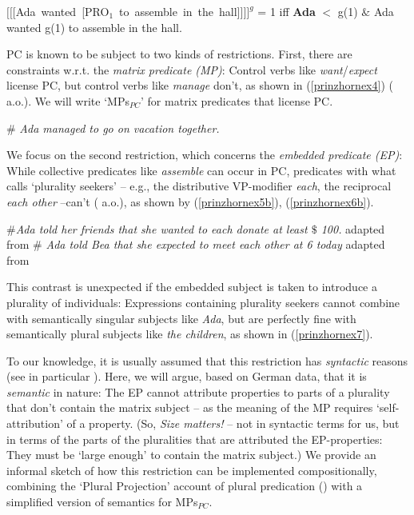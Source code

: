 \documentclass[output=paper,colorlinks,citecolor=brown,
]{langscibook}
\newcommand{\sem}[2]{\mbox{$[\![${#2}$]\!]^{#1}$}} %
\begin{document}
\ea	\label{prinzhornex3} \sem{g}{[Ada wanted [PRO$_{1}$ to assemble in the hall]]} = 1 iff \textbf{Ada} $<$ g(1) $\&$ Ada wanted g(1) to assemble in the hall. \z

PC is known to be subject to two kinds of restrictions. First, there are constraints w.r.t. the {\it matrix predicate (MP)}: Control verbs like {\it want}/{\it expect} license PC, but control verbs like {\it  manage} don't, as shown in (\ref{prinzhornex4}) (\citealt{Landau:2000, Pearson:2016} a.o.). We will write `MPs$_{PC}$' for matrix predicates that license PC.

\ea 	\label{prinzhornex4}
  $\#$ {\it Ada managed  to go on vacation together.} \hfill \cite[(2b)]{Pearson:2016}
\z
	
We focus on the second restriction, which concerns the {\it embedded predicate (EP)}: While collective predicates like  {\it assemble} can occur in PC, predicates with what \cite{Schwarzschild:1996} calls `plurality seekers' -- e.g., the distributive VP-modifier {\it each}, the reciprocal  {\it each other} --can't (\citealt{Landau:2000} a.o.), as shown by (\ref{prinzhornex5b}), (\ref{prinzhornex6b}).

\ea\label{prinzhornex5}
\ea \label{prinzhornex5b}  $\#${\it Ada told her friends that she wanted to each donate at least $\$$ 100.} \newline \phantom{.}\hfill adapted from \cite[48 (61a)]{Landau:2000}
\ex \label{prinzhornex6b}		 $\#$ {\it Ada told Bea that she expected to meet each other at 6 today} \newline \phantom{.}\hfill  adapted from \cite[59 (61a)]{Landau:2000}
\z\z

This contrast is unexpected if the embedded subject is taken to introduce a plurality of individuals: Expressions containing plurality seekers cannot combine with semantically singular subjects like {\it Ada}, but are perfectly fine with semantically plural subjects like {\it the children}, as shown in (\ref{prinzhornex7}).

\ea \label{prinzhornex7}
\z\z

To our knowledge, it is usually assumed that this restriction has {\it syntactic} reasons (see in particular \citealt{Landau:2000}). Here, we will argue, based on German data, that it is {\it semantic} in nature: The EP cannot attribute properties to parts of a plurality that don't contain the matrix subject --  as the meaning of the MP requires `self-attribution' of a property. (So, \textit{Size matters!} -- not in syntactic terms for us, but in terms of the parts of the pluralities that are attributed the EP-properties: They must be `large enough' to contain the matrix subject.) We provide an informal sketch of how this restriction can be implemented compositionally, combining  the `Plural Projection' account of plural predication (\citealt{Schmitt:2019, Haslinger:2018a, Haslinger:2018b}) with a simplified version of \cite{Pearson:2016} semantics for MPs$_{PC}$.
\end{document}
